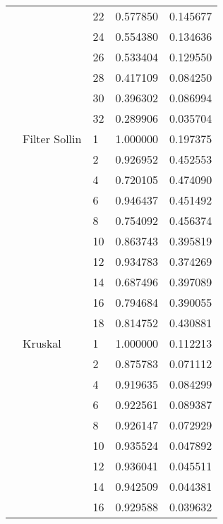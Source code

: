 \begin{tabular}{lllrr}
                      &            & 22 &  0.577850 &  0.145677 \\
                      &            & 24 &  0.554380 &  0.134636 \\
                      &            & 26 &  0.533404 &  0.129550 \\
                      &            & 28 &  0.417109 &  0.084250 \\
                      &            & 30 &  0.396302 &  0.086994 \\
                      &            & 32 &  0.289906 &  0.035704 \\
                      & Filter Sollin & 1  &  1.000000 &  0.197375 \\
                      &            & 2  &  0.926952 &  0.452553 \\
                      &            & 4  &  0.720105 &  0.474090 \\
                      &            & 6  &  0.946437 &  0.451492 \\
                      &            & 8  &  0.754092 &  0.456374 \\
                      &            & 10 &  0.863743 &  0.395819 \\
                      &            & 12 &  0.934783 &  0.374269 \\
                      &            & 14 &  0.687496 &  0.397089 \\
                      &            & 16 &  0.794684 &  0.390055 \\
                      &            & 18 &  0.814752 &  0.430881 \\
                      & Kruskal & 1  &  1.000000 &  0.112213 \\
                      &            & 2  &  0.875783 &  0.071112 \\
                      &            & 4  &  0.919635 &  0.084299 \\
                      &            & 6  &  0.922561 &  0.089387 \\
                      &            & 8  &  0.926147 &  0.072929 \\
                      &            & 10 &  0.935524 &  0.047892 \\
                      &            & 12 &  0.936041 &  0.045511 \\
                      &            & 14 &  0.942509 &  0.044381 \\
                      &            & 16 &  0.929588 &  0.039632 \\

\end{tabular}
